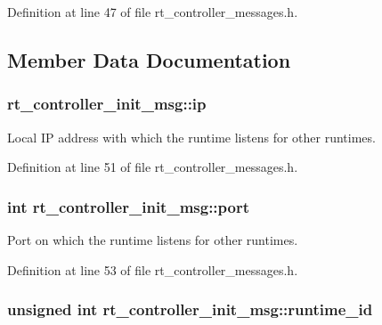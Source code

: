 Definition at line 47 of file rt\-\_\-controller\-\_\-messages.\-h.



\subsection{Member Data Documentation}
\hypertarget{structrt__controller__init__msg_a9cf153e2f8ab32bc6458db829d6583ce}{
\subsubsection[{ip}]{ rt\-\_\-controller\-\_\-init\-\_\-msg\-::ip}}\label{structrt__controller__init__msg_a9cf153e2f8ab32bc6458db829d6583ce}


Local I\-P address with which the runtime listens for other runtimes. 



Definition at line 51 of file rt\-\_\-controller\-\_\-messages.\-h.

\hypertarget{structrt__controller__init__msg_ab269a1da6a3fc076d8183244b7efbb24}{
\subsubsection[{port}]{\setlength{\rightskip}{0pt plus 5cm}int rt\-\_\-controller\-\_\-init\-\_\-msg\-::port}}\label{structrt__controller__init__msg_ab269a1da6a3fc076d8183244b7efbb24}


Port on which the runtime listens for other runtimes. 



Definition at line 53 of file rt\-\_\-controller\-\_\-messages.\-h.

\hypertarget{structrt__controller__init__msg_a97110c58e5b06491f20f50ae3712fd75}{
\subsubsection[{runtime\-\_\-id}]{\setlength{\rightskip}{0pt plus 5cm}unsigned int rt\-\_\-controller\-\_\-init\-\_\-msg\-::runtime\-\_\-id}}\label{structrt__controller__init__msg_a97110c58e5b06491f20f50ae3712fd75}



